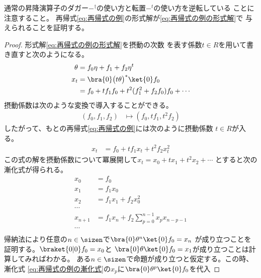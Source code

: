 	通常の昇降演算子のダガー$-^\dag$の使い方と転置$-^t$の使い方を逆転している
	ことに注意すること。
	再帰式\eqref{eq:再帰式の例}の形式解が\eqref{eq:再帰式の例の形式解}で
	与えられることを証明する。
	\begin{proof} %
		形式解\eqref{eq:再帰式の例の形式解}を摂動の次数
		を表す係数$t\in R$を用いて書き直すと次のようになる。
		\begin{equation*}\begin{split} %
			\theta &= f_0\eta + f_1 + f_2\eta^t \\
			x_t &= \bra{0}\bigl(t\theta\bigr)^*\ket{0}f_0 \\
			&= f_0 + tf_1f_0 + t^2(f_1^2+f_2f_0)f_0 + \cdots \\
		\end{split}\end{equation*} %
		摂動係数は次のような変換で導入することができる。
		\begin{equation*}\begin{split} %
			(f_0,f_1,f_2) &\mapsto (f_0, tf_1, t^2f_2)
		\end{split}\end{equation*} %
		したがって、もとの再帰式\eqref{eq:再帰式の例}には次のように摂動係数
		$t\in R$が入る。
		\begin{equation}\label{eq:摂動係数つき再帰式の例}\begin{split} %
			x_t &= f_0 + tf_1x_t + t^2f_2x_t^2
		\end{split}\end{equation} %
		この式の解を摂動係数について冪展開して$x_t=x_0+tx_1+t^2x_2+\cdots$
		とすると次の漸化式が得られる。
		\begin{equation}\label{eq:再帰式の例の漸化式}\begin{split} %
			x_0 &= f_0 \\
			x_1 &= f_1x_0 \\
			x_2 &= f_1x_1 + f_2x_0^2 \\
			\cdots \\
			x_{n+1} &= f_1x_n + f_2\sum_{p=0}^{n-1}x_px_{n-p-1} \\
			\cdots \\
		\end{split}\end{equation} %
		帰納法により任意の$n\in\sizen$で$\bra{0}\theta^n\ket{0}f_0=x_n$
		が成り立つことを証明する。$\braket{0|0}f_0=x_0$と
		$\bra{0}\theta\ket{0}f_0=x_1$が成り立つことは計算してみればわかる。
		ある$n\in\sizen$で命題が成り立つと仮定する。この時、漸化式
		\eqref{eq:再帰式の例の漸化式}の$x_p$に$\bra{0}\theta^p\ket{0}f_0$を代入

\end{proof}
